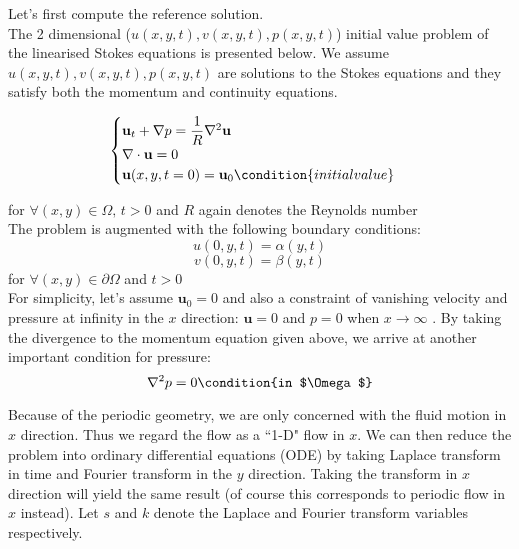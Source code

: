 Let's first compute the reference solution.\\
The 2 dimensional ($u(x, y, t), v(x, y, t), p(x, y, t)$) initial value problem of the linearised Stokes equations is presented below. We assume $u(x, y, t), v(x, y, t), p(x, y, t)$ are solutions to the Stokes equations and they satisfy both the momentum and continuity equations.

\begin{equation}\label{eq:linearised Stokes equations}
\begin{cases}
\textbf{u}_t + \nabla p = \dfrac{1}{R} \nabla^2 \textbf{u}\\
\nabla \cdot \textbf{u} = 0\\
\textbf{u} (x,y,t=0) = \textbf{u}_0 \condition{ initial value}\\
\end{cases}
\end{equation}

for $\forall (x,y) \in \Omega, \, t > 0$ and $R$ again denotes the Reynolds number\\
The problem is augmented with the following boundary conditions:
\begin{dmath*}
u(0,y,t) = \alpha (y,t)
\end{dmath*}
\begin{dmath*}
v(0,y,t) = \beta (y,t)
\end{dmath*}
for $\forall (x,y) \in \partial \Omega$ and $t > 0$\\

For simplicity, let's assume $\textbf{u}_0 = 0$ and also a constraint of vanishing velocity and pressure at infinity in the $x$ direction: $\textbf{u} = 0$ and $p = 0$ when $x \rightarrow \infty$ . By taking the divergence to the momentum equation given above, we arrive at another important condition for pressure:
\begin{dmath}
\nabla^2 p = 0 \condition{in $\Omega$}
\end{dmath}

Because of the periodic geometry, we are only concerned with the fluid motion in $x$ direction. Thus we regard the flow as a ``1-D" flow in $x$. We can then reduce the problem into ordinary differential equations (ODE) by taking Laplace transform in time and Fourier transform in the $y$ direction. Taking the transform in $x$ direction will yield the same result (of course this corresponds to periodic flow in $x$ instead). Let $s$ and $k$ denote the Laplace and Fourier transform variables respectively.

